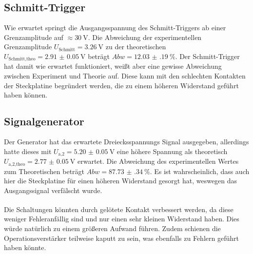 \subsection{Schmitt-Trigger}
Wie erwartet springt die Ausgangsspannung des Schmitt-Triggers ab einer Grenzamplitude auf $\approx \SI{30}{\V}$.
Die Abweichung der experimentellen Grenzamplitude $U_\text{Schmitt} = \SI{3.26}{\V}$ zu der theoretischen $U_\text{Schmitt,theo} = \SI{2.91(5)}{\V}$ beträgt $Abw = \SI{12.03(19)}{}\%$.
Der Schmitt-Trigger hat damit wie erwartet funktioniert, weißt aber eine gewisse Abweichung zwischen Experiment und Theorie auf.
Diese kann mit den schlechten Kontakten der Steckplatine begründert werden, die zu einem höheren Widerstand geführt haben können.
\subsection{Signalgenerator}
Der Generator hat das erwartete Dreiecksspannungs Signal ausgegeben, allerdings hatte dieses mit $U_\text{a,2} = \SI{5.20(5)}{\V}$ eine höhere Spannung als theoretisch ${U_\text{a,2,theo} = \SI{2.77(5)}{\V}}$ erwartet.
Die Abweichung des experimentellen Wertes zum Theoretischen beträgt $Abw = \SI{87.73(34)}{}\%$.
Es ist wahrscheinlich, dass auch hier die Steckplatine für einen höheren Widerstand gesorgt hat, weswegen das Ausgangssignal verfälscht wurde.
\\\\
Die Schaltungen könnten durch gelötete Kontakt verbessert werden, da diese weniger Fehleranfällig sind und nur einen sehr kleinen Widerstand haben.
Dies würde natürlich zu einem größeren Aufwand führen.
Zudem schienen die Operationsverstärker teilweise kaputt zu sein, was ebenfalls zu Fehlern geführt haben könnte.
